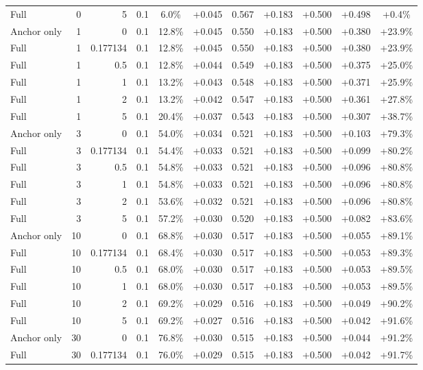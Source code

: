 \begin{table}[htbp]
\begin{tabular}{lrrrccccccc}
Full & 0 & 5 & 0.1 & 6.0\% & +0.045 & 0.567 & +0.183 & +0.500 & +0.498 & +0.4\% \\
Anchor only & 1 & 0 & 0.1 & 12.8\% & +0.045 & 0.550 & +0.183 & +0.500 & +0.380 & +23.9\% \\
Full & 1 & 0.177134 & 0.1 & 12.8\% & +0.045 & 0.550 & +0.183 & +0.500 & +0.380 & +23.9\% \\
Full & 1 & 0.5 & 0.1 & 12.8\% & +0.044 & 0.549 & +0.183 & +0.500 & +0.375 & +25.0\% \\
Full & 1 & 1 & 0.1 & 13.2\% & +0.043 & 0.548 & +0.183 & +0.500 & +0.371 & +25.9\% \\
Full & 1 & 2 & 0.1 & 13.2\% & +0.042 & 0.547 & +0.183 & +0.500 & +0.361 & +27.8\% \\
Full & 1 & 5 & 0.1 & 20.4\% & +0.037 & 0.543 & +0.183 & +0.500 & +0.307 & +38.7\% \\
Anchor only & 3 & 0 & 0.1 & 54.0\% & +0.034 & 0.521 & +0.183 & +0.500 & +0.103 & +79.3\% \\
Full & 3 & 0.177134 & 0.1 & 54.4\% & +0.033 & 0.521 & +0.183 & +0.500 & +0.099 & +80.2\% \\
Full & 3 & 0.5 & 0.1 & 54.8\% & +0.033 & 0.521 & +0.183 & +0.500 & +0.096 & +80.8\% \\
Full & 3 & 1 & 0.1 & 54.8\% & +0.033 & 0.521 & +0.183 & +0.500 & +0.096 & +80.8\% \\
Full & 3 & 2 & 0.1 & 53.6\% & +0.032 & 0.521 & +0.183 & +0.500 & +0.096 & +80.8\% \\
Full & 3 & 5 & 0.1 & 57.2\% & +0.030 & 0.520 & +0.183 & +0.500 & +0.082 & +83.6\% \\
Anchor only & 10 & 0 & 0.1 & 68.8\% & +0.030 & 0.517 & +0.183 & +0.500 & +0.055 & +89.1\% \\
Full & 10 & 0.177134 & 0.1 & 68.4\% & +0.030 & 0.517 & +0.183 & +0.500 & +0.053 & +89.3\% \\
Full & 10 & 0.5 & 0.1 & 68.0\% & +0.030 & 0.517 & +0.183 & +0.500 & +0.053 & +89.5\% \\
Full & 10 & 1 & 0.1 & 68.0\% & +0.030 & 0.517 & +0.183 & +0.500 & +0.053 & +89.5\% \\
Full & 10 & 2 & 0.1 & 69.2\% & +0.029 & 0.516 & +0.183 & +0.500 & +0.049 & +90.2\% \\
Full & 10 & 5 & 0.1 & 69.2\% & +0.027 & 0.516 & +0.183 & +0.500 & +0.042 & +91.6\% \\
Anchor only & 30 & 0 & 0.1 & 76.8\% & +0.030 & 0.515 & +0.183 & +0.500 & +0.044 & +91.2\% \\
Full & 30 & 0.177134 & 0.1 & 76.0\% & +0.029 & 0.515 & +0.183 & +0.500 & +0.042 & +91.7\% \\

\end{tabular}
\end{table}

